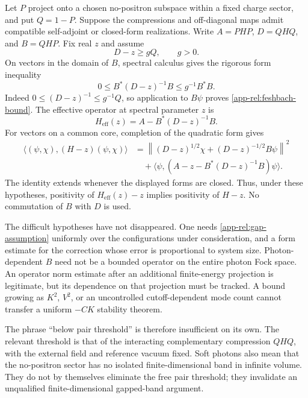 Let $P$ project onto a chosen no-positron subspace within a fixed charge
sector, and put $Q=1-P$. Suppose the compressions and off-diagonal maps
admit compatible self-adjoint or closed-form realizations. Write
$A=PHP$, $D=QHQ$, and $B=QHP$. Fix real $z$ and assume
\begin{equation}
 D-z\ge gQ,\qquad g>0.
 \label{app-rel:gap-assumption}
\end{equation}
On vectors in the domain of $B$, spectral calculus gives the rigorous form
inequality
\begin{equation}
 0\le B^*(D-z)^{-1}B\le g^{-1}B^*B.
 \label{app-rel:feshbach-bound}
\end{equation}
Indeed $0\le(D-z)^{-1}\le g^{-1}Q$, so application to $B\psi$ proves
\eqref{app-rel:feshbach-bound}. The effective operator at spectral
parameter $z$ is
\begin{equation}
 H_{\mathrm{eff}}(z)=A-B^*(D-z)^{-1}B.
 \label{app-rel:feshbach-operator}
\end{equation}
For vectors on a common core, completion of the quadratic form gives
\begin{align}
 \langle(\psi,\chi),(H-z)(\psi,\chi)\rangle
 &=\left\|(D-z)^{1/2}\chi+(D-z)^{-1/2}B\psi\right\|^2
 \nonumber\\
 &\quad+\langle\psi,
       (A-z-B^*(D-z)^{-1}B)\psi\rangle.
 \label{app-rel:feshbach-square}
\end{align}
The identity extends whenever the displayed forms are closed. Thus, under
these hypotheses, positivity of $H_{\mathrm{eff}}(z)-z$ implies
positivity of $H-z$. No commutation of $B$ with $D$ is used.

The difficult hypotheses have not disappeared. One needs
\eqref{app-rel:gap-assumption} uniformly over the configurations under
consideration, and a form estimate for the correction whose error is
proportional to system size. Photon-dependent $B$ need not be a bounded
operator on the entire photon Fock space. An operator norm estimate after
an additional finite-energy projection is legitimate, but its dependence
on that projection must be tracked. A bound growing as $K^2$, $V^2$, or an
uncontrolled cutoff-dependent mode count cannot transfer a uniform
$-CK$ stability theorem.

The phrase ``below pair threshold'' is therefore insufficient on its own.
The relevant threshold is that of the interacting complementary
compression $QHQ$, with the external field and reference vacuum fixed.
Soft photons also mean that the no-positron sector has no isolated
finite-dimensional band in infinite volume. They do not by themselves
eliminate the free pair threshold; they invalidate an unqualified
finite-dimensional gapped-band argument.

